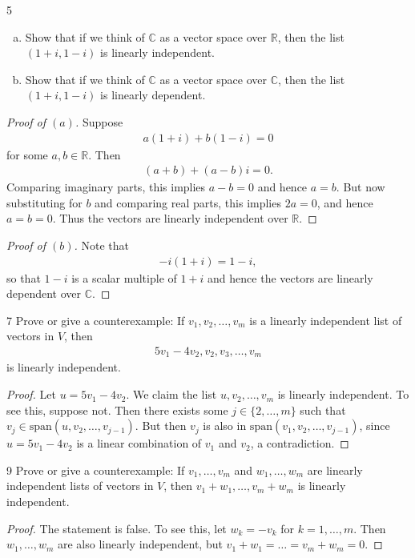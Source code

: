 \documentclass[11pt]{extarticle}
\newenvironment{problem}[1]{\begin{prob*}{#1}{}}{\end{prob*}}
\newcommand{\R}{\mathbb{R}}
\newcommand{\C}{\mathbb{C}}
\newcommand{\Span}{\mathrm{span}}
\begin{document}
\begin{problem}{5}
\begin{enumerate}[(a)]
\item Show that if we think of $\C$ as a vector space over $\R$, then the list $(1 + i, 1 - i)$ is linearly independent.
\item Show that if we think of $\C$ as a vector space over $\C$, then the list $(1+ i, 1- i)$ is linearly dependent.
\end{enumerate}
\end{problem}
\begin{proof}[Proof of $(a)$]
Suppose 
\begin{align*}
a(1 + i) + b(1 - i) = 0
\end{align*}
for some $a,b\in\R$.  Then
\begin{align*}
(a + b) + (a - b)i = 0.
\end{align*}
Comparing imaginary parts, this implies $a-b = 0$ and hence $a=b$.  But now substituting for $b$ and comparing real parts, this implies $2a = 0$, and hence $a=b=0$.  Thus the vectors are linearly independent over $\R$.
\end{proof}
\begin{proof}[Proof of $(b)$]
Note that 
\begin{align*}
-i(1+ i) = 1 - i,
\end{align*}
so that $1-i$ is a scalar multiple of $1+i$ and hence the vectors are linearly dependent over $\C$.
\end{proof}

\begin{problem}{7}
Prove or give a counterexample: If $v_1,v_2,\dots, v_m$ is a linearly independent list of vectors in $V$, then
\begin{align*}
5v_1-4v_2, v_2, v_3, \dots, v_m
\end{align*}
is linearly independent.
\end{problem}
\begin{proof}
Let $u = 5v_1-4v_2$.  We claim the list $u, v_2, \dots, v_m$ is linearly independent.  To see this, suppose not.  Then there exists some $j\in \{2,\dots, m\}$ such that $v_j\in \Span(u, v_2, \dots, v_{j-1})$.  But then $v_j$ is also in $\Span(v_1, v_2,\dots, v_{j-1})$, since $u = 5v_1-4v_2$ is a linear combination of $v_1$ and $v_2$, a contradiction.
\end{proof}

\begin{problem}{9}
Prove or give a counterexample: If $v_1,\dots,v_m$ and $w_1,\dots, w_m$ are linearly independent lists of vectors in $V$, then $v_1+w_1, \dots, v_m + w_m$ is linearly independent.
\end{problem}
\begin{proof}
The statement is false.  To see this, let $w_k = -v_k$ for $k=1,\dots, m$.  Then $w_1,\dots, w_m$ are also linearly independent, but $v_1+w_1 = \dots = v_m + w_m = 0$.
\end{proof}
\end{document}

